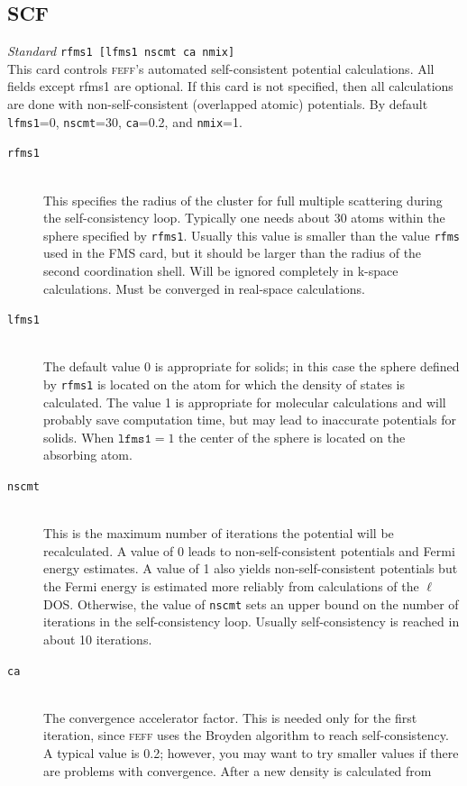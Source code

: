\documentclass[11pt,oneside]{report} %
\renewcommand{\htmlref}[2]{\hyperlink{#2}{#1}}
\newcommand{\program}[1]{\textsc{#1}}
\newcommand{\feff}{\program{feff}}
\newenvironment{Card}[4]%
      {\vspace{3ex}%
        \subsection{#1}
        \quad\textsl{#3}\newline
        \quad\texttt{#2}\newline%
        \label{card:#4}\\}
      {}
\renewcommand{\htmlref}[2]{{#1}} %
\begin{document}
\begin{Card}{SCF}{rfms1 [lfms1 nscmt ca nmix]}{Standard}{scf}
  This card controls {\feff}'s automated self-consistent potential
  calculations. All fields except rfms1 are optional.
  If this card is not specified, then all calculations are done with 
  non-self-consistent (overlapped atomic) potentials.
  By default \texttt{lfms1}=0, \texttt{nscmt}=30, \texttt{ca}=0.2, and 
  \texttt{nmix}=1.
  \begin{description}
  \item[\texttt{rfms1}]\hfill\\ This specifies the radius of the cluster
    for full multiple scattering during the self-consistency loop.
    Typically one needs about 30 atoms within the sphere specified by
    \texttt{rfms1}. Usually this value is smaller than the value \texttt{rfms}
    used in the \htmlref{FMS}{card:fms} card, but it should be larger than the 
    radius of the second coordination shell.  Will be ignored completely in k-space calculations.
    Must be converged in real-space calculations.
  \item[\texttt{lfms1}]\hfill\\ The default value 0 is appropriate for
    solids; in this case the sphere defined by \texttt{rfms1} is
    located on the atom for which the density of states is calculated.
    The value 1 is appropriate for molecular calculations and will
    probably save computation time, but may lead to inaccurate
    potentials for solids. When $\mathtt{lfms1} = 1$ the center of the
    sphere is located on the absorbing atom.
  \item[\texttt{nscmt}]\hfill\\ This is the maximum number of iterations
    the potential will be recalculated. A value of 0 leads to
    non-self-consistent potentials and Fermi energy estimates. A value of
    1 also yields non-self-consistent potentials but the Fermi energy is
    estimated more reliably from calculations of the $\ell$DOS.
    Otherwise, the value of \texttt{nscmt} sets an
    upper bound on the number of iterations in the self-consistency
    loop. Usually self-consistency is reached in about 10 iterations.
  \item[\texttt{ca}]\hfill\\ The convergence accelerator factor. This
    is needed only for the first iteration, since {\feff} uses
    the Broyden algorithm to reach self-consistency. A typical value
    is 0.2; however, you may want to try smaller values if there are
    problems with convergence. After a new density is calculated from

\end{description}
\end{Card}
\end{document}

